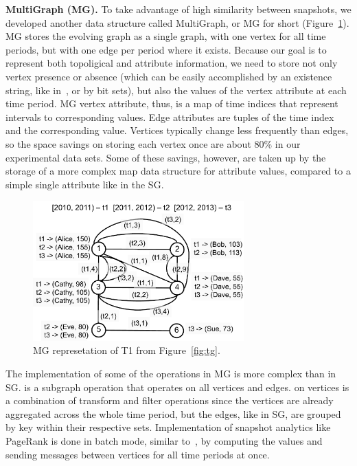 {\bf MultiGraph (MG).}  To take advantage of high similarity between
snapshots, we developed another data structure called MultiGraph, or
MG for short (Figure~\ref{fig:mg}).  MG stores the evolving graph as a
single graph, with one vertex for all time periods, but with one edge
per period where it exists.  Because our goal is to represent both
topoligical and attribute information, we need to store not only
vertex presence or absence (which can be easily accomplished by an
existence string, like in~\cite{Kan2009}, or by bit sets), but also
the values of the vertex attribute at each time period.  MG vertex
attribute, thus, is a map of time indices that represent intervals to
corresponding values.  Edge attributes are tuples of the time index
and the corresponding value.  Vertices typically change less
frequently than edges, so the space savings on storing each vertex
once are about 80\% in our experimental data sets.  Some of these
savings, however, are taken up by the storage of a more complex map
data structure for attribute values, compared to a simple single
attribute like in the SG.  

\begin{figure}[t!]
\includegraphics[width=3.2in]{figs/mg.pdf}
\caption{MG represetation of T1 from Figure~\ref{fig:tg}.}
\label{fig:mg}
\end{figure}

The implementation of some of the \ql operations in MG is more complex
than in SG.   is a subgraph operation that operates on
all vertices and edges.   on vertices is a combination
of transform and filter operations since the vertices are already
aggregated across the whole time period, but the edges, like in SG,
are grouped by key within their respective sets.  Implementation of
snapshot analytics like PageRank is done in batch mode, similar
to~\cite{DBLP:journals/tos/MiaoHLWYZPCC15}, by computing the values
and sending messages between vertices for all time periods at once.


